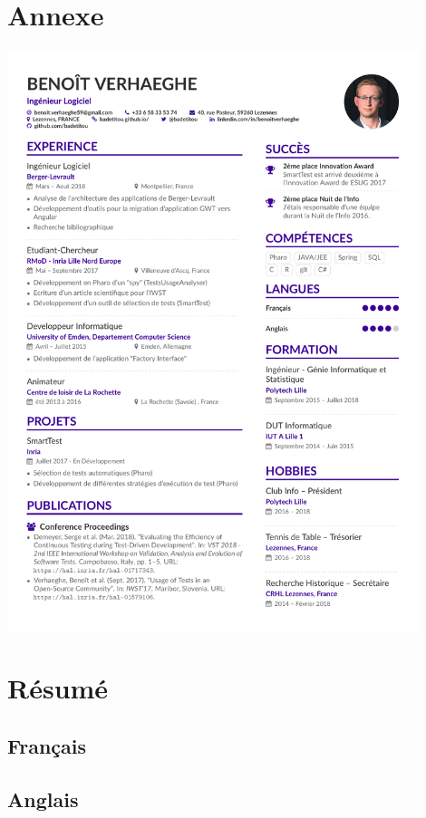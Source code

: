 \newpage

\hypertarget{annexe}{%
\section{Annexe}\label{annexe}}

\includegraphics[width=0.9\textwidth,height=\textheight]{cv/cv.pdf}
\newpage

\hypertarget{ruxe9sumuxe9}{%
\section{Résumé}\label{ruxe9sumuxe9}}

\hypertarget{franuxe7ais}{%
\subsection{Français}\label{franuxe7ais}}

\hypertarget{anglais}{%
\subsection{Anglais}\label{anglais}}

